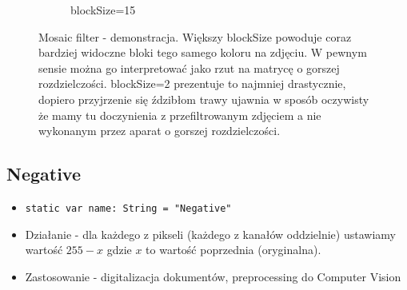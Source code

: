 \documentclass[a4paper]{article}
\begin{document}
\begin{figure}[H]
\begin{subfigure}{0.2\textwidth}
        \caption{blockSize=15}
        \label{fig:dog_mosaic_15}
    \end{subfigure}
    \caption{Mosaic filter - demonstracja. Większy blockSize powoduje coraz bardziej widoczne bloki tego samego koloru na zdjęciu. W pewnym sensie można go interpretować jako rzut na matrycę o gorszej rozdzielczości. blockSize=2 prezentuje to najmniej drastycznie, dopiero przyjrzenie się ździbłom trawy ujawnia w sposób oczywisty że mamy tu doczynienia z przefiltrowanym zdjęciem a nie wykonanym przez aparat o gorszej rozdzielczości.}
    \label{fig:mosaic}
\end{figure}

\subsection{Negative}

\begin{itemize}
    \item \texttt{static var name: String = "Negative"}
    \item Działanie - dla każdego z pikseli (każdego z kanałów oddzielnie) ustawiamy wartość $255 - x$ gdzie $x$ to wartość poprzednia (oryginalna).
    \item Zastosowanie - digitalizacja dokumentów, preprocessing do Computer Vision
\end{itemize}
\end{document}
